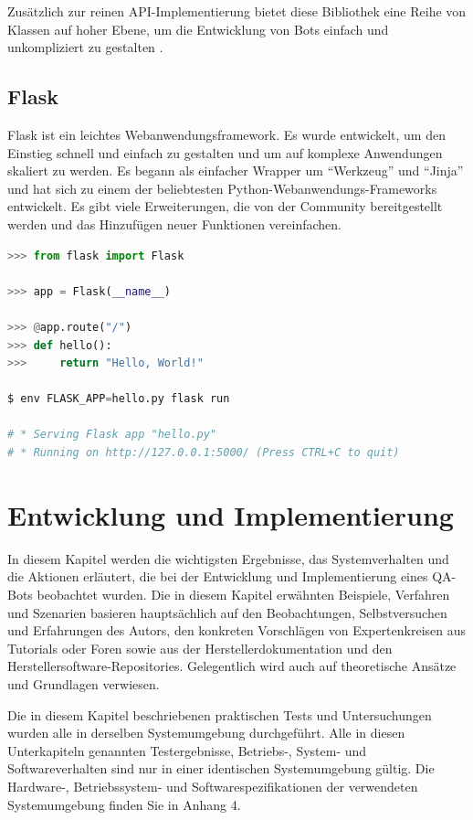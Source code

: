 \documentclass[
        ngerman,
        paper=a4,
        numbers=noendperiod,
]{scrreprt}
\begin{document}
Zusätzlich zur reinen API-Implementierung bietet diese Bibliothek eine Reihe von Klassen auf hoher Ebene, um die Entwicklung von Bots einfach und unkompliziert zu gestalten \citep{Python-telegram-bot/python-telegram-bot:Refuse}.


\section{Flask}
Flask ist ein leichtes Webanwendungsframework. Es wurde entwickelt, um den Einstieg schnell und einfach zu gestalten und um auf komplexe Anwendungen skaliert zu werden. Es begann als einfacher Wrapper um \enquote{Werkzeug} und \enquote{Jinja} und hat sich zu einem der beliebtesten Python-Webanwendungs-Frameworks entwickelt. Es gibt viele Erweiterungen, die von der Community bereitgestellt werden und das Hinzufügen neuer Funktionen vereinfachen.

\begin{lstlisting}[language=Python, caption=Ein einfaches Flask Beispiel]
>>> from flask import Flask

>>> app = Flask(__name__)

>>> @app.route("/")
>>> def hello():
>>>     return "Hello, World!"

$ env FLASK_APP=hello.py flask run

# * Serving Flask app "hello.py"
# * Running on http://127.0.0.1:5000/ (Press CTRL+C to quit)
\end{lstlisting}

\chapter{Entwicklung und Implementierung}
In diesem Kapitel werden die wichtigsten Ergebnisse, das Systemverhalten und die Aktionen erläutert, die bei der Entwicklung und Implementierung eines QA-Bots beobachtet wurden. Die in diesem Kapitel erwähnten Beispiele, Verfahren und Szenarien basieren hauptsächlich auf den Beobachtungen, Selbstversuchen und Erfahrungen des Autors, den konkreten Vorschlägen von Expertenkreisen aus Tutorials oder Foren sowie aus der Herstellerdokumentation und den Herstellersoftware-Repositories. Gelegentlich wird auch auf theoretische Ansätze und Grundlagen verwiesen.

Die in diesem Kapitel beschriebenen praktischen Tests und Untersuchungen wurden alle in derselben Systemumgebung durchgeführt. Alle in diesen Unterkapiteln genannten Testergebnisse, Betriebs-, System- und Softwareverhalten sind nur in einer identischen Systemumgebung gültig. Die Hardware-, Betriebssystem- und Softwarespezifikationen der verwendeten Systemumgebung finden Sie in Anhang 4. %
\end{document}
